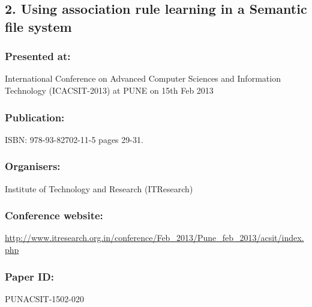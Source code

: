 \newpage
\subsection*{2. Using association rule learning in a Semantic file system}
\subsubsection{Presented at:} International Conference on Advanced Computer Sciences and Information Technology (ICACSIT-2013) at PUNE on 15th Feb 2013
\subsubsection{Publication:} ISBN: 978-93-82702-11-5 pages 29-31.
\subsubsection{Organisers:} Institute of Technology and Research (ITResearch)
\subsubsection{Conference website:} \url{http://www.itresearch.org.in/conference/Feb_2013/Pune_feb_2013/acsit/index.php}
\hspace*{-1.5cm}
\subsubsection{Paper ID:} PUNACSIT-1502-020
\newpage
